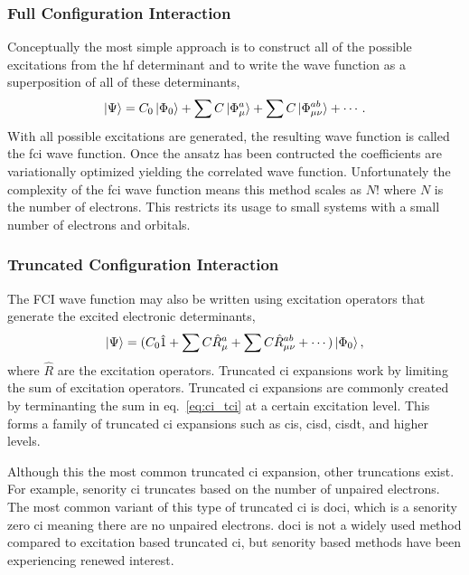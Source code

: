 \subsubsection{Full Configuration Interaction}
Conceptually the most simple approach is to construct all of the possible excitations from the \gls{hf} determinant and to write the wave function as a superposition of all of these determinants,
\begin{equation}
\ket{\Psi} = C_0 \ket{\Phi_0} + \sum C \ket{\Phi_{\mu}^{a}} + \sum C \ket{\Phi_{\mu\nu}^{ab}} + \cdots.
\end{equation}
With all possible excitations are generated, the resulting wave function is called the \gls{fci} wave function.
Once the ansatz has been contructed the coefficients are variationally optimized yielding the correlated wave function.
Unfortunately the complexity of the \gls{fci} wave function means this method scales as $N!$ where $N$ is the number of electrons.
This restricts its usage to small systems with a small number of electrons and orbitals.

\subsubsection{Truncated Configuration Interaction}
The FCI wave function may also be written using excitation operators that generate the excited electronic determinants,
\begin{equation}
    \ket{\Psi} = (C_0 \hat{1} + \sum C \hat{R}_{\mu}^{a} + \sum C \hat{R}_{\mu\nu}^{ab} + \cdots )\ket{\Phi_0},
    \label{eq:ci_tci}
\end{equation}
where $\hat{R}$ are the excitation operators.
Truncated \gls{ci} expansions work by limiting the sum of excitation operators.
Truncated \gls{ci} expansions are commonly created by terminanting the sum in eq.~\ref{eq:ci_tci} at a certain excitation level.
This forms a family of truncated \gls{ci} expansions such as \gls{cis}, \gls{cisd}, \gls{cisdt}, and higher levels.

Although this the most common truncated \gls{ci} expansion, other truncations exist.
For example, senority \gls{ci} truncates based on the number of unpaired electrons.
The most common variant of this type of truncated \gls{ci} is \gls{doci}, which is a senority zero \gls{ci} meaning there are no unpaired electrons.\cite{10.1021/j100818a001, 10.1063/1.1701519, 10.1063/1.1841109, 10.1021/jp963953l,10.1021/jp963953l}
\gls{doci} is not a widely used method compared to excitation based truncated \gls{ci}, but senority based methods have been experiencing renewed interest.\cite{10.1021/jp963953l,10.1063/1.5130660,10.1063/1.4904384,10.1021/ct300902c,10.1080/00268976.2013.874600,10.1021/jp502127v,10.1021/jp502127v,10.1063/1.4880819,10.1021/acs.jpclett.2c00730}

